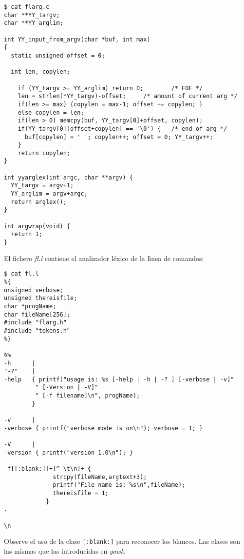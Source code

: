 \begin{verbatim}
$ cat flarg.c
char **YY_targv;
char **YY_arglim;
 
int YY_input_from_argv(char *buf, int max)
{
  static unsigned offset = 0;
 
  int len, copylen;
 
    if (YY_targv >= YY_arglim) return 0;        /* EOF */
    len = strlen(*YY_targv)-offset;     /* amount of current arg */
    if(len >= max) {copylen = max-1; offset += copylen; }
    else copylen = len;
    if(len > 0) memcpy(buf, YY_targv[0]+offset, copylen);
    if(YY_targv[0][offset+copylen] == '\0') {   /* end of arg */
      buf[copylen] = ' '; copylen++; offset = 0; YY_targv++;
    }
    return copylen;
}
 
int yyarglex(int argc, char **argv) {
  YY_targv = argv+1;
  YY_arglim = argv+argc;
  return arglex();
}
 
int argwrap(void) {
  return 1;
}    
\end{verbatim}
El fichero \emph{fl.l} contiene el analizador l\'exico de la l\'{\i}nea de comandos:
\begin{verbatim}
$ cat fl.l
%{
unsigned verbose;
unsigned thereisfile;
char *progName;
char fileName[256];
#include "flarg.h"
#include "tokens.h"
%}
 
%%
-h      |
"-?"    |
-help   { printf("usage is: %s [-help | -h | -? ] [-verbose | -v]"
         " [-Version | -V]"
         " [-f filename]\n", progName);
        }
 
-v      |
-verbose { printf("verbose mode is on\n"); verbose = 1; }
 
-V      |
-version { printf("version 1.0\n"); }
 
-f[[:blank:]]+[^ \t\n]+ {
              strcpy(fileName,argtext+3);
              printf("File name is: %s\n",fileName);
              thereisfile = 1;
            }
.
 
\n                                 
\end{verbatim}
Observe el uso de la clase \verb|[:blank:]| para reconocer
los blancos. Las clases son las mismas que las introducidas
en \emph{gawk}.

